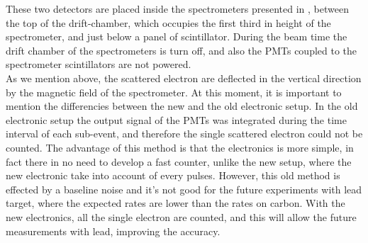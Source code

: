 \begin{figure}[hbtp]
\centering
{}
\end{figure}


These  two detectors are placed inside the spectrometers presented in , between the top of the drift-chamber, which occupies the first third in height of the spectrometer, and just below a panel of scintillator. During the beam time the drift chamber of the spectrometers is turn off, and also the PMTs coupled to the spectrometer scintillators are not powered.\\
As we mention above, the scattered electron are deflected in the vertical direction by the magnetic field of the spectrometer. 
At this moment, it is important to mention the differencies between the new and the old electronic setup. In the old electronic setup the output signal of the PMTs was integrated during the time interval of each sub-event, and therefore the single scattered electron could not be counted. The advantage of this method is that the electronics is more simple, in fact there in no need to develop a fast counter, unlike the new setup, where the new electronic take into account of every pulses. However, this old method is effected by a baseline noise and it's not good for the future experiments with lead target, where the expected rates are lower than the rates on carbon.
With the new electronics, all the single electron are counted, and this will allow the future measurements with lead, improving the accuracy. 

